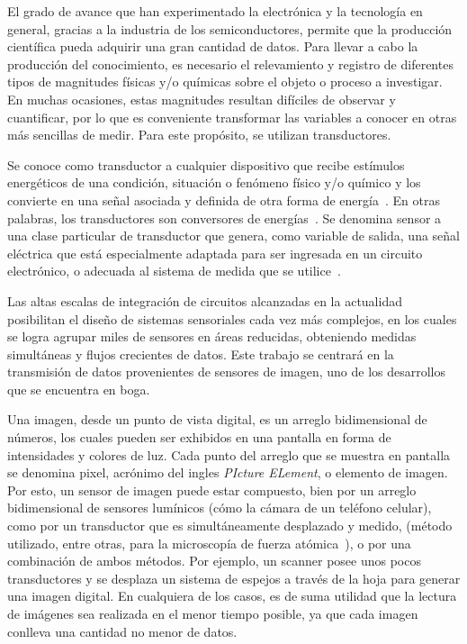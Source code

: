 El grado de avance que han experimentado la electrónica y la tecnología en general, gracias a la industria de los semiconductores, permite que la producción científica pueda adquirir una gran cantidad de datos. Para llevar a cabo la producción del conocimiento, es necesario el relevamiento y registro de diferentes tipos de magnitudes físicas y/o químicas sobre el objeto o proceso a investigar. En muchas ocasiones, estas magnitudes resultan difíciles de observar y cuantificar, por lo que es conveniente transformar las variables a conocer en otras más sencillas de medir. Para este propósito, se utilizan transductores.%

Se conoce como transductor a cualquier dispositivo que recibe estímulos energéticos de una condición, situación o fenómeno físico y/o químico y los convierte en una señal asociada y definida de otra forma de energía~\cite{Pallas-Areny2001,considine1971encyclopedia}. En otras palabras, los transductores son conversores de energías~\cite{Pallas-Areny2001,considine1971encyclopedia,PerezGarcia2008}. Se denomina sensor a una clase particular de transductor que genera, como variable de salida, una señal eléctrica que está especialmente adaptada para ser ingresada en un circuito electrónico, o adecuada al sistema de medida que se utilice~\cite{Fraden2010,Slawinski2011,Ogata2002}.%

Las altas escalas de integración de circuitos alcanzadas en la actualidad posibilitan el diseño de sistemas sensoriales cada vez más complejos, en los cuales se logra agrupar miles de sensores en áreas reducidas, obteniendo medidas simultáneas y flujos crecientes de datos. Este trabajo se centrará en la transmisión de datos provenientes de sensores de imagen, uno de los desarrollos que se encuentra en boga.%

Una imagen, desde un punto de vista digital, es un arreglo bidimensional de números, los cuales pueden ser exhibidos en una pantalla en forma de intensidades y colores de luz. Cada punto del arreglo que se muestra en pantalla se denomina pixel, acrónimo del ingles {\it PIcture ELement}, o elemento de imagen. Por esto, un sensor de imagen puede estar compuesto, bien por un arreglo bidimensional de sensores lumínicos (cómo la cámara de un teléfono celular), como por un transductor que es simultáneamente desplazado y medido, (método utilizado, entre otras, para la microscopía de fuerza atómica~\cite{Binnig1983}), o por una combinación de ambos métodos. Por ejemplo, un scanner posee unos pocos transductores y se desplaza un sistema de espejos a través de la hoja para generar una imagen digital. En cualquiera de los casos, es de suma utilidad que la lectura de imágenes sea realizada en el menor tiempo posible, ya que cada imagen conlleva una cantidad no menor de datos.%

